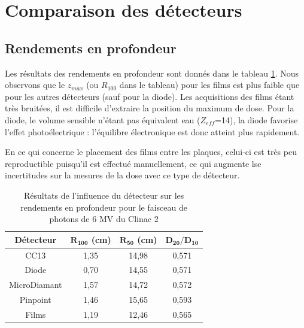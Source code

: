 \documentclass{book}
\begin{document}
  

\section{Comparaison des détecteurs}
\subsection{Rendements en profondeur}

Les résultats des rendements en profondeur sont donnés dans le tableau \ref*{table_rdt_detecteurs_ponctuels}. Nous observons que le $z_{max}$ (ou $R_{100}$ dans le tableau) pour les films est plus faible que pour les autres détecteurs (sauf pour la diode). Les acquisitions des films étant très bruitées, il est difficile d'extraire la position du maximum de dose. Pour la diode, le volume sensible n'étant pas équivalent eau ($Z_{eff}$=14), la diode favorise l'effet photoélectrique : l'équilibre électronique est donc atteint plus rapidement.

En ce qui concerne le placement des films entre les plaques, celui-ci est très peu reproductible puisqu'il est effectué manuellement, ce qui augmente lse incertitudes sur la mesures de la dose avec ce type de détecteur.

\begin{table}[h]
  \centering
  \begin{tabular}{cccc}
    \toprule
    \textbf{Détecteur} & $\mathbf{R_{100}}$ \textbf{(cm)} & $\mathbf{R_{50}}$ \textbf{(cm)} & $\mathbf{D_{20}/D_{10}}$ \\
    \toprule
    CC13 & 1,35 & 14,98 & 0,571 \\
    Diode & 0,70 & 14,55 & 0,571 \\
    MicroDiamant & 1,57 & 14,72 & 0,572 \\
    Pinpoint & 1,46 & 15,65 & 0,593 \\
    Films & 1,19 & 12,46 & 0,565 \\
    \bottomrule
  \end{tabular}
  \caption{Résultats de l'influence du détecteur sur les rendements en profondeur pour le faisceau de photons de 6 MV du Clinac 2}
  \label{table_rdt_detecteurs_ponctuels}
\end{table}
\end{document}
